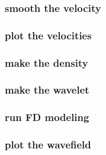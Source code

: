 \begin{frame} \frametitle{smooth the velocity}
  \normalsize
  \blueshade{
    
  }
\end{frame}
\cwpnote{}

\begin{frame} \frametitle{plot the velocities}
  \normalsize
  \blueshade{
    
  }
\end{frame}
\cwpnote{}

\begin{frame}  \end{frame}
\begin{frame}  \end{frame}

\begin{frame} \frametitle{make the density}
  \normalsize
  \blueshade{
    
  }
\end{frame}
\cwpnote{}

\begin{frame} \frametitle{make the wavelet}
  \normalsize
  \blueshade{
    
  }
\end{frame}
\cwpnote{}

\begin{frame}  \end{frame}

\begin{frame} \frametitle{run FD modeling}
  \normalsize
  \blueshade{
    
  }
\end{frame}
\cwpnote{}

\begin{frame} \frametitle{plot the wavefield}
  \normalsize
  \blueshade{
    
  }
\end{frame}
\cwpnote{}

